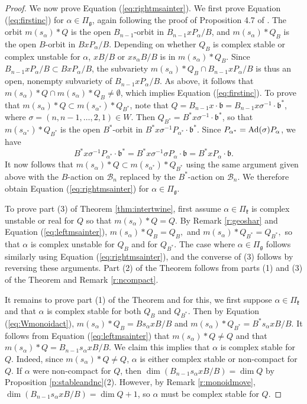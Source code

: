 \documentclass[12pt]{amsart}
\numberwithin{equation}{section}
\newcommand{\fk}{\mbox{${\mathfrak k}$}}
\newcommand{\fg}{\mbox{${\mathfrak g}$}}
\newcommand{\fb}{\mbox{${\mathfrak b}$}}
\newcommand{\Ad}{{\rm Ad}}
\newcommand{\B}{\mathcal{B}}
\newcommand{\ms}{m(s_{\alpha})}
\begin{document}
\begin{proof}
 We now prove Equation (\ref{eq:rightmsainter}).  We first prove Equation (\ref{eq:firstinc}) for $\alpha\in\Pi_{\fg}$, again following the proof of Proposition 4.7 of \cite{CE21I}.   The orbit $\ms*Q$ is the open $B_{n-1}$-orbit 
 in $B_{n-1}x P_{\alpha}/B$, and $\ms*Q_{B}$ is the open $B$-orbit in $BxP_{\alpha}/B$.  Depending on whether $Q_B$ is complex stable or complex unstable for $\alpha$, $xB/B$ or $xs_{\alpha}B/B$ is in $\ms*Q_B$.    Since $B_{n-1} xP_{\alpha} /B\subset B x P_{\alpha}/B$, the subvariety $\ms*Q_{B}\cap B_{n-1}xP_{\alpha}/B$ is thus an open, nonempty subvariety of $B_{n-1}xP_{\alpha}/B$.  As above, it follows that $\ms*Q\cap\ms*Q_{B}\neq\emptyset$, which implies Equation (\ref{eq:firstinc}).
 To prove that $\ms*Q\subset m(s_{\alpha^{*}})*Q_{B^{*}}$, note that $Q=B_{n-1}x\cdot \fb =B_{n-1}x\sigma^{-1}\cdot {\fb}^{*}$, where $\sigma=(n, n-1,\dots, 2,1)\in W$.  Then $Q_{B^{*}}=B^{*} x\sigma^{-1}\cdot\fb^{*}$, so that $m(s_{\alpha^{*}})*Q_{B^{*}}$ is the open $B^{*}$-orbit in $B^{*}x\sigma^{-1} P_{\alpha^{*}}\cdot \fb^{*}$.  Since $P_{\alpha^{*}}=\Ad(\sigma)P_{\alpha}$, we have 
 \begin{equation}\label{eq:unwind}
 B^{*} x\sigma^{-1} P_{\alpha^{*}} \cdot \fb^*=B^{*}x\sigma^{-1}\sigma P_{\alpha}\cdot \fb=B^{*}xP_{\alpha} \cdot \fb.
 \end{equation}
It now follows that $\ms*Q\subset m(s_{\alpha^{*}})*Q_{B^{*}}$ using the same argument given above with the $B$-action on $\B_n$ replaced by the $B^{*}$-action on $\B_n$.  We therefore obtain Equation (\ref{eq:rightmsainter}) for $\alpha\in \Pi_{ \fg}$.  

To prove part (3) of Theorem \ref{thm:intertwine}, first assume $\alpha \in \Pi_{\fk}$ is complex unstable or real for $Q$ so that $\ms*Q=Q.$   By Remark \ref{r:geoshar} and Equation (\ref{eq:leftmsainter}), $\ms*Q_B=Q_B,$ and  $\ms*Q_{B^*}=Q_{B^*},$ so that $\alpha$  is complex unstable for $Q_B$ and for $Q_{B^*}.$  The case where $\alpha \in \Pi_{\fg}$ follows similarly using Equation (\ref{eq:rightmsainter}), and the converse of (3) follows by reversing these arguments.   Part (2) of the Theorem follows from parts (1) and (3) of the Theorem and Remark \ref{r:ncompact}.

It remains to prove part (1) of the Theorem and for this, we first suppose $\alpha\in \Pi_{\fk}$ and that $\alpha$ is complex stable for both $Q_{B}$ and $Q_{B^{*}}$.  Then by Equation (\ref{eq:Wmonoidact}), $\ms*Q_{B}=Bs_{\alpha}x B/B$ and $\ms*Q_{B^{*}}=B^{*}s_{\alpha}xB/B.$  It follows from Equation (\ref{eq:leftmsainter}) that $\ms*Q\neq Q$ and that $\ms*Q=B_{n-1}s_{\alpha} x B/B$.  We claim this implies that $\alpha$ is complex stable for $Q$.  Indeed, since $\ms*Q\neq Q$, $\alpha$ is either complex stable or non-compact   for $Q$.  If $\alpha$ were non-compact for $Q$, then $\dim(B_{n-1} s_{\alpha}xB/B)=\dim Q$ by Proposition \ref{p:stableandnc}(2).  However, by Remark \ref{r:monoidmove}, $\dim (B_{n-1} s_{\alpha}xB/B)=\dim Q+1$, so $\alpha$ must be complex stable for $Q.$  


\end{proof}
\end{document}
